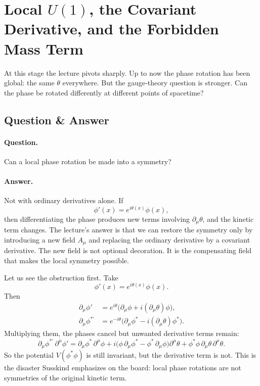 \section{Local \(U(1)\), the Covariant Derivative, and the Forbidden Mass Term}

At this stage the lecture pivots sharply. Up to now the phase rotation has been global: the same \(\theta\) everywhere. But the gauge-theory question is stronger. Can the phase be rotated differently at different points of spacetime?

\subsection{Question \& Answer}

\paragraph{Question.} Can a local phase rotation be made into a symmetry?

\paragraph{Answer.} Not with ordinary derivatives alone. If
\[
\phi'(x)=e^{i\theta(x)}\phi(x),
\]
then differentiating the phase produces new terms involving \(\partial_\mu\theta\), and the kinetic term changes. The lecture's answer is that we can restore the symmetry only by introducing a new field \(A_\mu\) and replacing the ordinary derivative by a covariant derivative. The new field is not optional decoration. It is the compensating field that makes the local symmetry possible.

Let us see the obstruction first. Take
\begin{equation}
\phi'(x)=e^{i\theta(x)}\phi(x).
\label{eq:local-transform}
\end{equation}
Then
\begin{align}
\partial_\mu\phi'
&=
e^{i\theta}\big(\partial_\mu\phi+i(\partial_\mu\theta)\phi\big),
\label{eq:dphi-prime}
\\
\partial_\mu\phi^{*\prime}
&=
e^{-i\theta}\big(\partial_\mu\phi^*-i(\partial_\mu\theta)\phi^*\big).
\label{eq:dphistar-prime}
\end{align}
Multiplying them, the phases cancel but unwanted derivative terms remain:
\begin{equation}
\partial_\mu\phi^{*\prime}\,\partial^\mu\phi'
=
\partial_\mu\phi^*\,\partial^\mu\phi
+i\big(\phi\,\partial_\mu\phi^*-\phi^*\,\partial_\mu\phi\big)\partial^\mu\theta
+\phi^*\phi\,\partial_\mu\theta\,\partial^\mu\theta.
\label{eq:local-failure}
\end{equation}
So the potential \(V(\phi^*\phi)\) is still invariant, but the derivative term is not. This is the disaster Susskind emphasizes on the board: local phase rotations are not symmetries of the original kinetic term.

